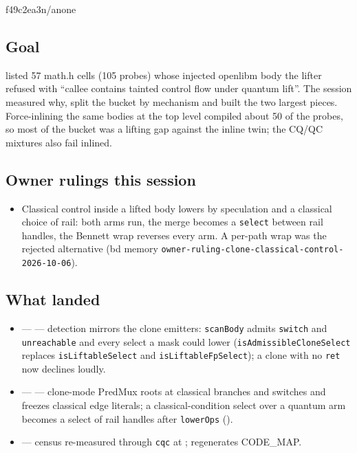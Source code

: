 %
  {f49c2ea3}{n/a}{none}

\subsection*{Goal}
 listed 57 math.h cells (105 probes) whose injected openlibm body the lifter
refused with ``callee contains tainted control flow under quantum lift''. The session
measured why, split the bucket by mechanism and built the two largest pieces. Force-inlining
the same bodies at the top level compiled about 50 of the probes, so most of the bucket was a
lifting gap against the inline twin; the CQ/QC mixtures also fail inlined.

\subsection*{Owner rulings this session}
\begin{itemize}
  \item Classical control inside a lifted body lowers by speculation and a classical choice of
  rail: both arms run, the merge becomes a \texttt{select} between rail handles, the Bennett
  wrap reverses every arm. A per-path wrap was the rejected alternative (bd memory
  \texttt{owner-ruling-clone-classical-control-2026-10-06}).
\end{itemize}

\subsection*{What landed}
\begin{itemize}
  \item {} ---  --- detection mirrors the clone emitters:
  \texttt{scanBody} admits \texttt{switch} and \texttt{unreachable} and every select a mask could
  lower (\texttt{isAdmissibleCloneSelect} replaces \texttt{isLiftableSelect} and
  \texttt{isLiftableFpSelect}); a clone with no \texttt{ret} now declines loudly.
  \item {} ---  --- clone-mode PredMux roots at classical
  branches and switches and freezes classical edge literals; a classical-condition select over a
  quantum arm becomes a select of rail handles after \texttt{lowerOps}
  ().
  \item {} --- census re-measured through \texttt{cqc} at ;  regenerates CODE\_MAP.
\end{itemize}

